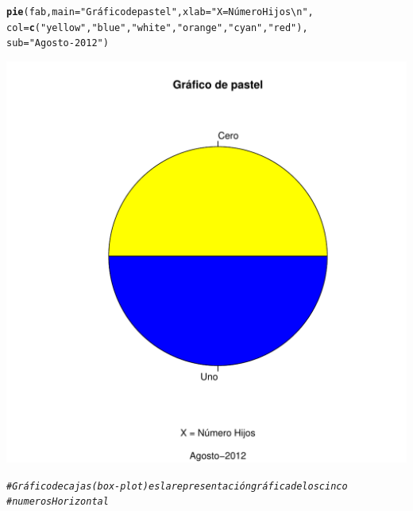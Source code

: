 \documentclass[12pt,letterpaper]{article}\usepackage[]{graphicx}\usepackage[]{color}
\makeatletter
\def\maxwidth{ %
  \ifdim\Gin@nat@width>\linewidth
    \linewidth
  \else
    \Gin@nat@width
  \fi
}
\newcommand{\hlstr}[1]{\textcolor[rgb]{0.192,0.494,0.8}{#1}}%
\newcommand{\hlcom}[1]{\textcolor[rgb]{0.678,0.584,0.686}{\textit{#1}}}%
\newcommand{\hlstd}[1]{\textcolor[rgb]{0.345,0.345,0.345}{#1}}%
\newcommand{\hlkwc}[1]{\textcolor[rgb]{0.333,0.667,0.333}{#1}}%
\newcommand{\hlkwd}[1]{\textcolor[rgb]{0.737,0.353,0.396}{\textbf{#1}}}%
\newenvironment{kframe}{%
 \def\at@end@of@kframe{}%
 \ifinner\ifhmode%
  \def\at@end@of@kframe{\end{minipage}}%
  \begin{minipage}{\columnwidth}%
 \fi\fi%
 \def\FrameCommand##1{\hskip\@totalleftmargin \hskip-\fboxsep
 \colorbox{shadecolor}{##1}\hskip-\fboxsep
     \hskip-\linewidth \hskip-\@totalleftmargin \hskip\columnwidth}%
 \MakeFramed {\advance\hsize-\width
   \@totalleftmargin\z@ \linewidth\hsize
   \@setminipage}}%
 {\par\unskip\endMakeFramed%
 \at@end@of@kframe}
\newenvironment{knitrout}{}{} %
\makeatother
\begin{document}
\begin{enumerate}
\begin{knitrout}
\begin{kframe}
\begin{alltt}
\hlkwd{pie}\hlstd{(fab,} \hlkwc{main}\hlstd{=}\hlstr{"Gráfico de pastel"}\hlstd{,} \hlkwc{xlab}\hlstd{=}\hlstr{"X = Número Hijos\textbackslash{}n"}\hlstd{,}
    \hlkwc{col}\hlstd{=}\hlkwd{c}\hlstd{(}\hlstr{"yellow"}\hlstd{,} \hlstr{"blue"}\hlstd{,} \hlstr{"white"}\hlstd{,} \hlstr{"orange"}\hlstd{,} \hlstr{"cyan"}\hlstd{,} \hlstr{"red"}\hlstd{),}
    \hlkwc{sub}\hlstd{=}\hlstr{"Agosto-2012"}\hlstd{)}
\end{alltt}
\end{kframe}
\includegraphics[width=\maxwidth]{figure/unnamed-chunk-26-1} 

\end{knitrout}

\begin{knitrout}
\color{fgcolor}\begin{kframe}
\begin{alltt}
\hlcom{# Gráfico de cajas (box-plot) es la representación gráfica de los cinco }
\hlcom{# numeros Horizontal}


\end{alltt}
\end{kframe}
\end{knitrout}
\end{enumerate}
\end{document}
